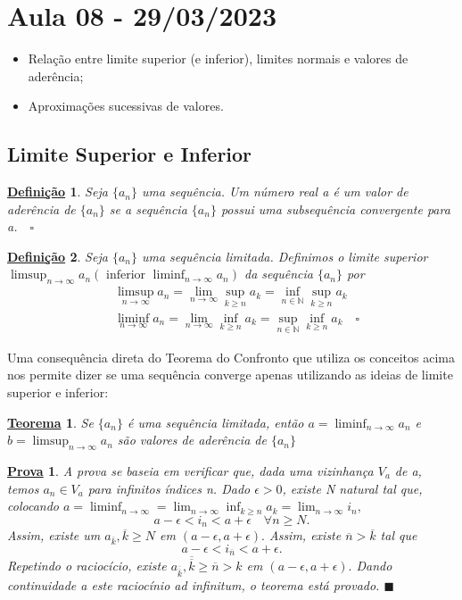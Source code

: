\documentclass{article}
\newtheorem*{def*}{\underline{Defini\c c\~ao}}
\newtheorem*{theorem*}{\underline{Teorema}}
\newtheorem*{proof*}{\underline{Prova}}
\renewcommand\qedsymbol{$\blacksquare$}
\begin{document}
\section{Aula 08 - 29/03/2023}
\begin{itemize}
  \item Rela\c c\~ao entre limite superior (e inferior), limites normais e valores de ader\^encia;
  \item Aproxima\c c\~oes sucessivas de valores.
\end{itemize}
\subsection{Limite Superior e Inferior}
\begin{def*}
   Seja $\{a_{n}\} $ uma sequ\^encia. Um n\'umero real a \'e um valor de ader\^encia de $\{a_{n}\} $ se a sequ\^encia $\{a_{n}\}$ possui
uma subsequ\^encia convergente para a.$\quad\square$
\end{def*}
\begin{def*}
  Seja $\{a_{n}\} $  uma sequ\^encia limitada. Definimos o limite superior $\displaystyle\limsup_{n\to\infty}a_{n}(\text{ inferior }\liminf_{n\to\infty}a_{n})$ da 
sequ\^encia $\{a_{n}\} $ por 
  \begin{align*}
    &\limsup_{n\to\infty}a_{n} = \lim_{n\to\infty}\sup_{k\geq{n}}a_{k} = \inf_{n\in \mathbb{N}}\sup_{k\geq{n}}a_{k}\\
    &\liminf_{n\to\infty}a_{n} = \lim_{n\to\infty}\inf_{k\geq{n}}a_{k} = \sup_{n\in \mathbb{N}}\inf_{k\geq{n}}a_{k}\quad\square
  \end{align*}
\end{def*}
  Uma consequ\^encia direta do Teorema do Confronto que utiliza os conceitos acima nos permite dizer se uma sequ\^encia converge apenas
utilizando as ideias de limite superior e inferior:
 \begin{theorem*}
   Se $\{a_{n}\} $ \'e uma sequ\^encia limitada, ent\~ao $a = \liminf_{n\to\infty}a_{n}$ e $b = \limsup_{n\to\infty}a_{n}$
   s\~ao valores de ader\^encia de $\{a_{n}\} $
 \end{theorem*}
\begin{proof*}
  A prova se baseia em verificar que, dada uma vizinhan\c ca $V_{a}$ de a, temos $a_{n}\in V_{a}$ para infinitos \'indices n. 
Dado $\epsilon > 0$, existe N natural tal que, colocando $a =\displaystyle \liminf_{n\to\infty} = \lim_{n\to\infty}\inf_{k\geq{n}}a_{k} = \lim_{n\to\infty}i_{n},$
  $$
    a - \epsilon < i_{n} < a + \epsilon \quad \forall n \geq{N}.
  $$
  Assim, existe um $a_{\overline{k}}, \overline{k}\geq{N}$ em $(a-\epsilon, a+\epsilon).$ Assim, existe $\overline{n} > \overline{k}$ tal que 
    $$
      a - \epsilon < i_{\overline{n}} < a + \epsilon.
    $$
    Repetindo o racioc\'icio, existe $a_{\overline{\overline{k}}}, \overline{\overline{k}} \geq{\overline{n}} > k$ em $(a - \epsilon, a + \epsilon).$
  Dando continuidade a este racioc\'inio ad infinitum, o teorema est\'a provado. \qedsymbol
\end{proof*}
\end{document}
